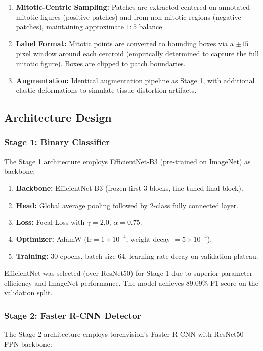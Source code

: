 \documentclass[journal]{IEEEtran}
\begin{document}
\begin{enumerate}
\item \textbf{Mitotic-Centric Sampling:} Patches are extracted centered on annotated mitotic figures (positive patches) and from non-mitotic regions (negative patches), maintaining approximate $1:5$ balance.
\item \textbf{Label Format:} Mitotic points are converted to bounding boxes via a $\pm 15$ pixel window around each centroid (empirically determined to capture the full mitotic figure). Boxes are clipped to patch boundaries.
\item \textbf{Augmentation:} Identical augmentation pipeline as Stage 1, with additional elastic deformations to simulate tissue distortion artifacts.
\end{enumerate}

\subsection{Architecture Design}

\subsubsection{Stage 1: Binary Classifier}
The Stage 1 architecture employs EfficientNet-B3 (pre-trained on ImageNet) as backbone:

\begin{enumerate}
\item \textbf{Backbone:} EfficientNet-B3 (frozen first 3 blocks, fine-tuned final block).
\item \textbf{Head:} Global average pooling followed by 2-class fully connected layer.
\item \textbf{Loss:} Focal Loss with $\gamma = 2.0$, $\alpha = 0.75$.
\item \textbf{Optimizer:} AdamW ($\text{lr} = 1 \times 10^{-4}$, weight decay $= 5 \times 10^{-4}$).
\item \textbf{Training:} $30$ epochs, batch size $64$, learning rate decay on validation plateau.
\end{enumerate}

EfficientNet was selected (over ResNet50) for Stage 1 due to superior parameter efficiency and ImageNet performance. The model achieves $89.09\%$ F1-score on the validation split.

\subsubsection{Stage 2: Faster R-CNN Detector}
The Stage 2 architecture employs torchvision's Faster R-CNN with ResNet50-FPN backbone:
\end{document}
